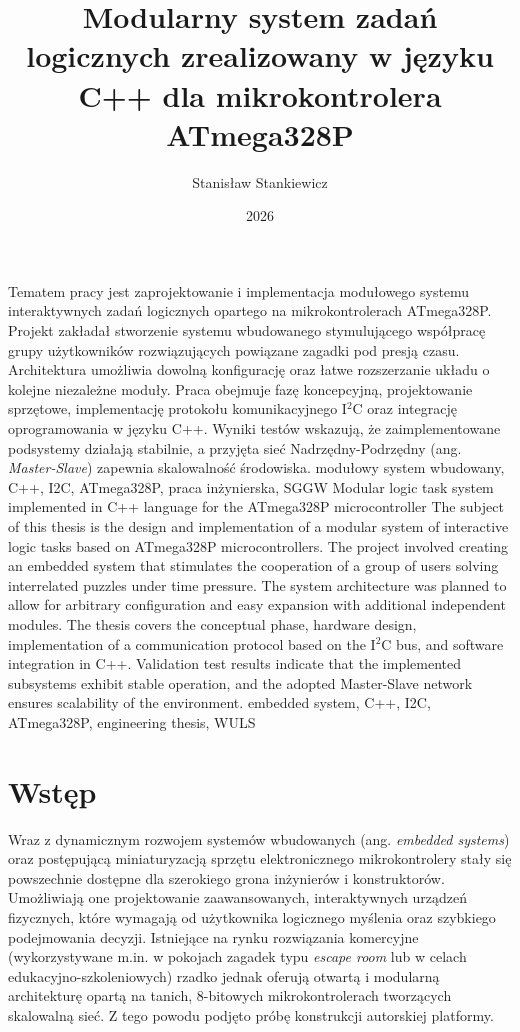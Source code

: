 \documentclass{SGGW-thesis}
\title{Modularny system zadań logicznych zrealizowany w języku C++ dla mikrokontrolera ATmega328P}
\author{Stanisław Stankiewicz}
\date{2026}
\begin{document}
\maketitle
\statementpage

\abstractpage
{Tematem pracy jest zaprojektowanie i implementacja modułowego systemu interaktywnych zadań logicznych opartego na mikrokontrolerach ATmega328P. Projekt zakładał stworzenie systemu wbudowanego stymulującego współpracę grupy użytkowników rozwiązujących powiązane zagadki pod presją czasu. Architektura umożliwia dowolną konfigurację oraz łatwe rozszerzanie układu o kolejne niezależne moduły. Praca obejmuje fazę koncepcyjną, projektowanie sprzętowe, implementację protokołu komunikacyjnego I$^2$C oraz integrację oprogramowania w języku C++. Wyniki testów wskazują, że zaimplementowane podsystemy działają stabilnie, a przyjęta sieć Nadrzędny-Podrzędny (ang. \textit{Master-Slave}) zapewnia skalowalność środowiska.}
{modułowy system wbudowany, C++, I2C, ATmega328P, praca inżynierska, SGGW}
{Modular logic task system implemented in C++ language for the ATmega328P microcontroller}
{The subject of this thesis is the design and implementation of a modular system of interactive logic tasks based on ATmega328P microcontrollers. The project involved creating an embedded system that stimulates the cooperation of a group of users solving interrelated puzzles under time pressure. The system architecture was planned to allow for arbitrary configuration and easy expansion with additional independent modules. The thesis covers the conceptual phase, hardware design, implementation of a communication protocol based on the I$^2$C bus, and software integration in C++. Validation test results indicate that the implemented subsystems exhibit stable operation, and the adopted Master-Slave network ensures scalability of the environment.}
{embedded system, C++, I2C, ATmega328P, engineering thesis, WULS}

{
  \doublespacing
  \tableofcontents
}

\startchapterfromoddpage %

\chapter{Wstęp}
Wraz z dynamicznym rozwojem systemów wbudowanych (ang. \textit{embedded systems}) oraz postępującą miniaturyzacją sprzętu elektronicznego mikrokontrolery stały się powszechnie dostępne dla szerokiego grona inżynierów i konstruktorów. Umożliwiają one projektowanie zaawansowanych, interaktywnych urządzeń fizycznych, które wymagają od użytkownika logicznego myślenia oraz szybkiego podejmowania decyzji. Istniejące na rynku rozwiązania komercyjne (wykorzystywane m.in. w pokojach zagadek typu \textit{escape room} lub w celach edukacyjno-szkoleniowych) rzadko jednak oferują otwartą i modularną architekturę opartą na tanich, 8-bitowych mikrokontrolerach tworzących skalowalną sieć. Z tego powodu podjęto próbę konstrukcji autorskiej platformy.
\end{document}
